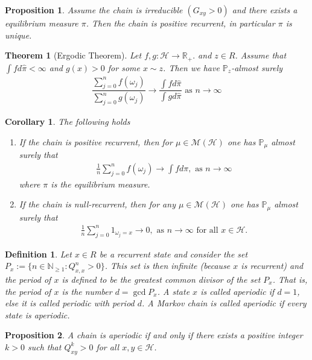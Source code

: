 \documentclass[11pt,a4paper, final]{article}
\newtheorem{thm}{Theorem}[section]
\newtheorem{prop}{Proposition}[section]
\newtheorem{cor}{Corollary}[section]
\newtheorem{defn}{Definition}[section]
\theoremstyle{definition}
\begin{document}
\begin{prop} Assume the chain is irreducible $(G_{xy} >0)$ and there exists a equilibrium measure $\pi$. Then the chain is positive recurrent, in particular $\pi$ is unique. 
\end{prop}
\newpage
\begin{thm}[Ergodic Theorem] Let $f,g: \mathcal{H} \to \mathbb{R}_+.$ and $z \in R$. Assume that $\int f d \hat{\pi} < \infty$ and $g(x) >0$ for some $x \sim z$. Then we have $\mathbb{P}_z$-almost surely
\begin{align*}
\dfrac{\sum_{j=0}^n f( \omega_j)}{\sum_{j=0}^n g( \omega_j)} \to \dfrac{\int f d \hat{\pi}}{\int g d \hat{\pi}} \text{ as } n \to \infty 
\end{align*}
\end{thm}
\begin{cor} The following holds 
\begin{enumerate}
\item If the chain is positive recurrent, then for $\mu \in \mathcal{M}( \mathcal{H})$ one has $\mathbb{P}_\mu$ almost surely that 
\begin{align*}
\frac{1}{n} \sum_{j=0}^n f( \omega_j) \to \int f d \pi, \text{ as } n \to \infty 
\end{align*}
where $\pi$ is the equilibrium measure. 
\item If the chain is null-recurrent, then for any $\mu \in \mathcal{M}( \mathcal{H})$ one has $\mathbb{P}_\mu$ almost surely that 
\begin{align*}
\frac{1}{n} \sum_{j=0}^n 1_{ \omega_j = x } \to 0, \text{ as } n \to \infty \text{ for all } x \in \mathcal{H}.
\end{align*}
\end{enumerate}
\end{cor}
\begin{defn} Let $x \in R$ be a recurrent state and consider the set \\  $P_x:= \lbrace n \in \mathbb{N}_{ \geq 1} : Q_{x,x}^n >0 \rbrace$. This set is then infinite (because $x$ is recurrent) and the period of $x$ is defined to be the greatest common divisor of the set $P_x$. That is, the period of $x$ is the number $d= \gcd P_x$. A state $x$ is called aperiodic if $d=1$, else it is called periodic with period $d$. A Markov chain is called aperiodic if every state is aperiodic. 
\end{defn}
\begin{prop} A chain is aperiodic if and only if there exists a positive integer $k >0$ such that $Q_{xy}^k >0$ for all $x,y \in \mathcal{H}$.
\end{prop}
\end{document}
